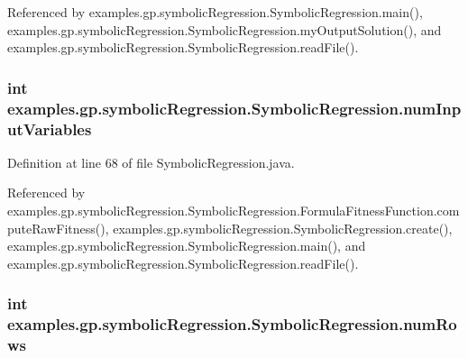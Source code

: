 Referenced by examples.\-gp.\-symbolic\-Regression.\-Symbolic\-Regression.\-main(), examples.\-gp.\-symbolic\-Regression.\-Symbolic\-Regression.\-my\-Output\-Solution(), and examples.\-gp.\-symbolic\-Regression.\-Symbolic\-Regression.\-read\-File().

\hypertarget{classexamples_1_1gp_1_1symbolic_regression_1_1_symbolic_regression_ab647e4a7ac66ce0c543f7906d302f3e3}{
\subsubsection[{num\-Input\-Variables}]{\setlength{\rightskip}{0pt plus 5cm}int examples.\-gp.\-symbolic\-Regression.\-Symbolic\-Regression.\-num\-Input\-Variables\hspace{0.3cm}{\ttfamily [static]}}}\label{classexamples_1_1gp_1_1symbolic_regression_1_1_symbolic_regression_ab647e4a7ac66ce0c543f7906d302f3e3}


Definition at line 68 of file Symbolic\-Regression.\-java.



Referenced by examples.\-gp.\-symbolic\-Regression.\-Symbolic\-Regression.\-Formula\-Fitness\-Function.\-compute\-Raw\-Fitness(), examples.\-gp.\-symbolic\-Regression.\-Symbolic\-Regression.\-create(), examples.\-gp.\-symbolic\-Regression.\-Symbolic\-Regression.\-main(), and examples.\-gp.\-symbolic\-Regression.\-Symbolic\-Regression.\-read\-File().

\hypertarget{classexamples_1_1gp_1_1symbolic_regression_1_1_symbolic_regression_ad5f6a203c254715be21128b6f82ab673}{
\subsubsection[{num\-Rows}]{\setlength{\rightskip}{0pt plus 5cm}int examples.\-gp.\-symbolic\-Regression.\-Symbolic\-Regression.\-num\-Rows\hspace{0.3cm}{\ttfamily [static]}}}\label{classexamples_1_1gp_1_1symbolic_regression_1_1_symbolic_regression_ad5f6a203c254715be21128b6f82ab673}


